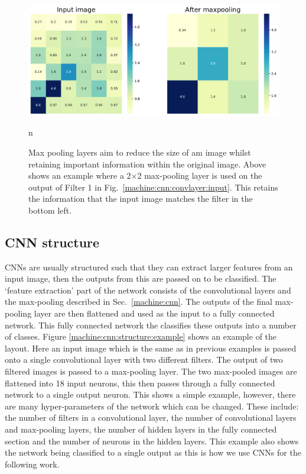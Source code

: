\begin{figure}[h]
    \centering
    \includegraphics[width=\columnwidth]{C4_cnn/maxpool.pdf}
    \caption[How max pooling layers are applied in \glspl{CNN}.]{Max pooling layers aim to reduce the size of am image whilst retaining important information within the original image. Above shows an example where a 2$\times$2 max-pooling layer is used on the output of Filter 1 in Fig.~\ref{machine:cnn:convlayer:input}. This retains the information that the input image matches the filter in the bottom left.}n
    \label{machine:cnn:maxpool:image}
\end{figure}

\subsection{CNN structure}

\glspl{CNN} are usually structured such that they can extract larger features from an input image, then the outputs from this are passed on to be classified.
The `feature extraction' part of the network consists of the convolutional layers and the max-pooling described in Sec.~\ref{machine:cnn}.
The outputs of the final max-pooling layer are then flattened and used as the input to a fully connected network.
This fully connected network the classifies these outputs into a number of classes.
Figure \ref{machine:cnn:structure:example} shows an example of the layout. 
Here an input image which is the same as in previous examples is passed onto a single convolutional layer with two different filters.
The output of two filtered images is passed to a max-pooling layer.
The two max-pooled images are flattened into 18 input neurons, this then passes through a fully connected network to a single output neuron.
This shows a simple example, however, there are many hyper-parameters of the network which can be changed.
These include: the number of filters in a convolutional layer, the number of convolutional layers and max-pooling layers, the number of hidden layers in the fully connected section and the number of neurons in the hidden layers. 
This example also shows the network being classified to a single output as this is how we use \glspl{CNN} for the following work.


